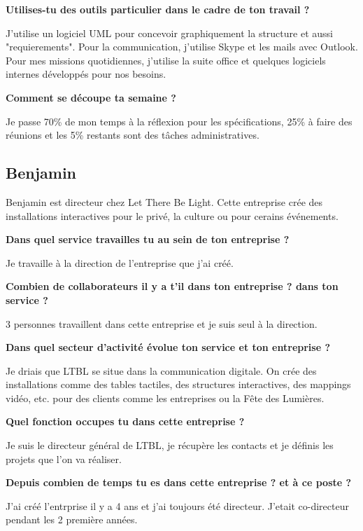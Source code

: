 \documentclass{article}
\newcommand{\question}[1]{\medskip\noindent\textbf{#1}\medskip}
\begin{document}
    \question{Utilises-tu des outils particulier dans le cadre de ton travail ?}

    J'utilise un logiciel UML pour concevoir graphiquement la structure et aussi "requierements".
    Pour la communication, j'utilise Skype et les mails avec Outlook.
    Pour mes missions quotidiennes, j'utilise la suite office et quelques logiciels internes développés pour nos besoins.

    \question{Comment se découpe ta semaine ?}

    Je passe 70\% de mon temps à la réflexion pour les spécifications, 25\% à faire des réunions et les 5\% restants sont des tâches administratives.

    \clearpage

    \subsection{Benjamin }

    Benjamin est directeur chez Let There Be Light.
    Cette entreprise crée des installations interactives pour le privé, la culture ou pour cerains événements.

    \question{Dans quel service travailles tu au sein de ton entreprise ?}

    Je travaille à la direction de l'entreprise que j'ai créé.

    \question{Combien de collaborateurs il y a t’il dans ton entreprise ? dans ton service ?}

    3 personnes travaillent dans cette entreprise et je suis seul à la direction.

    \question{Dans quel secteur d'activité évolue ton service et ton entreprise ?}

    Je driais que LTBL se situe dans la communication digitale.
    On crée des installations comme des tables tactiles, des structures interactives, des mappings vidéo, etc. pour des clients comme les entreprises ou la Fête des Lumières.

    \question{Quel fonction occupes tu dans cette entreprise ?}

    Je suis le directeur général de LTBL, je récupère les contacts et je définis les projets que l'on va réaliser.

    \question{Depuis combien de temps tu es dans cette entreprise ? et à ce poste ?}

    J'ai créé l'entrprise il y a 4 ans et j'ai toujours été directeur.
    J'etait co-directeur pendant les 2 première années.
\end{document}
